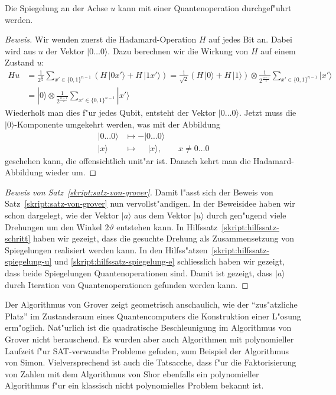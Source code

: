 \begin{hilfssatz}
Die Spiegelung an der Achse $u$ kann mit einer Quantenoperation
durchgef"uhrt werden.
\label{skript:hilfssatz-spiegelung-u}
\end{hilfssatz}

\begin{proof}[Beweis]
Wir wenden zuerst die Hadamard-Operation $H$ auf jedes Bit an.
Dabei wird aus $u$ der Vektor $|0\dots 0\rangle$.
Dazu berechnen wir die Wirkung von $H$ auf einem Zustand $u$:
\begin{align*}
Hu
&=
\frac1{2^{\frac{n}2}}\sum_{x'\in\{0,1\}^{n-1}}(H\,|0x'\rangle + H\,|1x'\rangle)
=
\frac1{\sqrt{2}}(H\,|0\rangle + H\,|1\rangle)\otimes
  \frac1{2^{\frac{n-1}2}}\sum_{x'\in\{0,1\}^{n-1}} |x'\rangle
\\
&=
|0\rangle\otimes
  \frac1{2^{\frac{n-1}2}}\sum_{x'\in\{0,1\}^{n-1}} |x'\rangle
\end{align*}
Wiederholt man dies f"ur jedes Qubit, entsteht der Vektor $|0\dots 0\rangle$.
Jetzt muss die $|0\rangle$-Komponente umgekehrt werden, was mit der Abbildung
\begin{align*}
|0\dots0\rangle&\mapsto          - |0\dots0\rangle\\
|x\rangle      &\mapsto \phantom{-}|x\rangle,\qquad x\ne 0\dots 0
\end{align*}
geschehen kann, die offensichtlich unit"ar ist.
Danach kehrt man die Hadamard-Abbildung wieder um.
\end{proof}

\begin{proof}[Beweis von Satz~\ref{skript:satz-von-grover}]
Damit l"asst sich der Beweis von Satz~\ref{skript:satz-von-grover}
nun vervollst"andigen.
In der Beweisidee haben wir schon dargelegt, wie der Vektor
$|a\rangle$ aus dem Vektor $|u\rangle$ durch gen"ugend viele
Drehungen um den Winkel $2\vartheta$ entstehen kann.
In Hilfssatz~\ref{skript:hilfssatz-schritt} haben wir gezeigt, dass
die gesuchte Drehung als Zusammensetzung von Spiegelungen realisiert
werden kann.
In den Hilfss"atzen~\ref{skript:hilfssatz-spiegelung-u} und
\ref{skript:hilfssatz-spiegelung-e} schliesslich haben wir gezeigt,
dass beide Spiegelungen Quantenoperationen sind.
Damit ist gezeigt, dass $|a\rangle$ durch Iteration von
Quantenoperationen gefunden werden kann.
\end{proof}

Der Algorithmus von Grover zeigt geometrisch anschaulich, wie der
``zus"atzliche Platz'' im Zustandsraum eines Quantencomputers
die Konstruktion einer L"osung erm"oglich.
Nat"urlich ist die quadratische Beschleunigung im Algorithmus
von Grover nicht berauschend.
Es wurden aber auch Algorithmen mit polynomieller Laufzeit f"ur
SAT-verwandte Probleme gefuden, zum Beispiel der Algorithmus von
Simon.
Vielversprechend ist auch die Tatsacche, dass f"ur die Faktorisierung
von Zahlen mit dem Algorithmus von Shor \cite{skript:arorabarak}
ebenfalls ein polynomieller Algorithmus f"ur ein klassisch
nicht polynomielles Problem bekannt ist.

